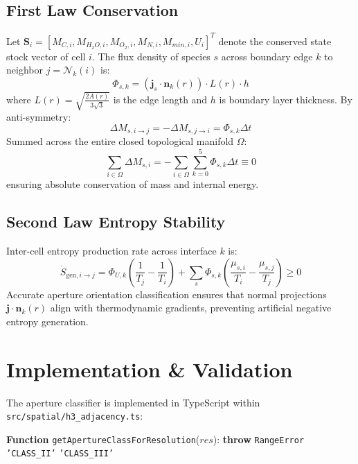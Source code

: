 \documentclass[10pt,journal,compsoc]{IEEEtran}
\begin{document}
\subsection{First Law Conservation}
Let $\mathbf{S}_i = [M_{C, i}, M_{H_2O, i}, M_{O_2, i}, M_{N, i}, M_{min, i}, U_i]^T$ denote the conserved state stock vector of cell $i$. The flux density of species $s$ across boundary edge $k$ to neighbor $j = \mathcal{N}_k(i)$ is:
\begin{equation}
\Phi_{s, k} = (\mathbf{j}_s \cdot \mathbf{n}_k(r)) \cdot L(r) \cdot h
\end{equation}
where $L(r) = \sqrt{\frac{2 A(r)}{3\sqrt{3}}}$ is the edge length and $h$ is boundary layer thickness.
By anti-symmetry:
\begin{equation}
\Delta M_{s, i \to j} = -\Delta M_{s, j \to i} = \Phi_{s, k} \Delta t
\end{equation}
Summed across the entire closed topological manifold $\Omega$:
\begin{equation}
\sum_{i \in \Omega} \Delta M_{s, i} = -\sum_{i \in \Omega} \sum_{k=0}^{5} \Phi_{s, k} \Delta t \equiv 0
\end{equation}
ensuring absolute conservation of mass and internal energy.

\subsection{Second Law Entropy Stability}
Inter-cell entropy production rate across interface $k$ is:
\begin{equation}
\dot{S}_{\text{gen}, i \to j} = \Phi_{U, k} \left( \frac{1}{T_j} - \frac{1}{T_i} \right) + \sum_s \Phi_{s, k} \left( \frac{\mu_{s, i}}{T_i} - \frac{\mu_{s, j}}{T_j} \right) \ge 0
\end{equation}
Accurate aperture orientation classification ensures that normal projections $\mathbf{j} \cdot \mathbf{n}_k(r)$ align with thermodynamic gradients, preventing artificial negative entropy generation.

\section{Implementation \& Validation}
The aperture classifier is implemented in TypeScript within \texttt{src/spatial/h3\_adjacency.ts}:
\begin{algorithmic}[1]
\STATE \textbf{Function} \texttt{getApertureClassForResolution}($res$):
    \STATE \textbf{throw} \texttt{RangeError}
\ENDIF
{}
    \RETURN \texttt{'CLASS\_II'}
\ELSE
    \RETURN \texttt{'CLASS\_III'}
\ENDIF
\end{algorithmic}
\end{document}
